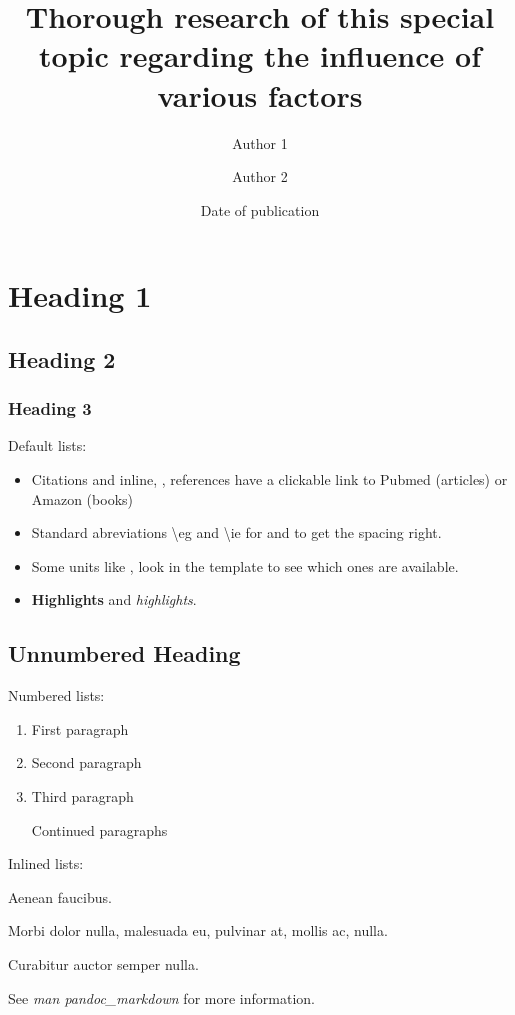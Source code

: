\documentclass[pagesize,english,DIV=calc,footinclude=false
    ,DIV=12,parskip=half,fontsize=12pt
]{scrartcl}
\title{Thorough research of this special topic regarding the influence of
various factors}
\author{Author 1 \and Author 2}
\date{Date of publication}
\begin{document}
\maketitle


{
\hypersetup{linkcolor=black}
\setcounter{tocdepth}{2}
\tableofcontents
}

\section{Heading 1}\label{heading-1}

\subsection{Heading 2}\label{heading-2}

\subsubsection{Heading 3}\label{heading-3}

Default lists:

\begin{itemize}
\tightlist
\item
  Citations \autocite{Macherey2006} and inline,
  \eg \textcite{Macherey2006}, references have a clickable link to
  Pubmed (articles) or Amazon (books)
\item
  Standard abreviations \textbackslash{}eg and \textbackslash{}ie for
  \eg and \ie to get the spacing right.
\item
  Some units like , look in the template to see which ones are
  available.
\item
  \textbf{Highlights} and \emph{highlights}.
\end{itemize}

\subsection*{Unnumbered Heading}\label{unnumbered-heading}

Numbered lists:

\begin{enumerate}
\def\labelenumi{\arabic{enumi}.}
\item
  First paragraph
\item
  Second paragraph
\item
  Third paragraph

  Continued paragraphs
\end{enumerate}

Inlined lists: \begin{inparaenum}[(1)] \item Aenean
faucibus. \item Morbi dolor nulla, malesuada eu, pulvinar at, mollis ac,
nulla. \item Curabitur auctor semper nulla. \end{inparaenum}

See \emph{man pandoc\_markdown} for more information.

\printbibliography
\end{document}

